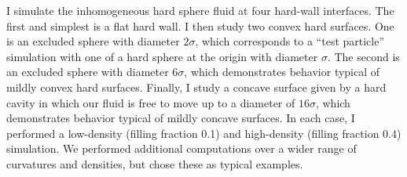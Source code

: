 I simulate the inhomogeneous hard sphere fluid at four hard-wall
interfaces.  The first and simplest is a flat hard wall.  I
then study two convex hard surfaces.  One is an excluded sphere with
diameter $2\sigma$, which corresponds to a ``test particle''
simulation with one of a hard sphere at the origin with diameter
$\sigma$.  The
second is an excluded sphere with diameter $6\sigma$,
which demonstrates behavior typical of mildly convex hard surfaces.
Finally, I study a concave surface given by a hard cavity in which
our fluid is free to move up to a diameter of $16\sigma$, which
demonstrates behavior typical of mildly concave surfaces.  In each
case, I performed a low-density (filling fraction 0.1) and high-density
(filling fraction 0.4) simulation.  We performed additional
computations over a wider range of curvatures and densities, but
chose these as typical examples.



